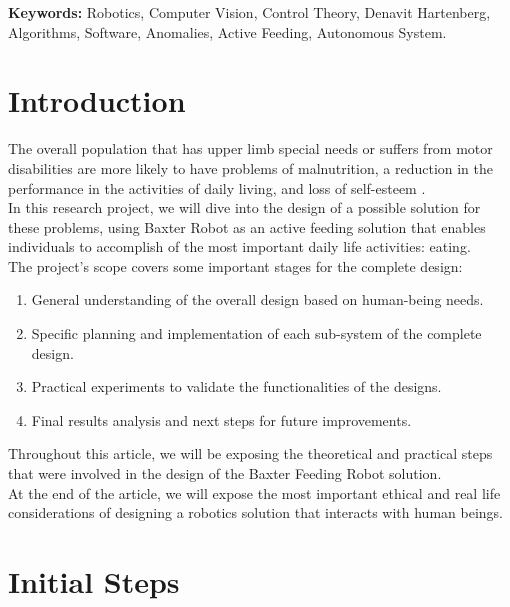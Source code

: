 \documentclass[11pt]{report} %
\begin{document}
\textbf{Keywords:} Robotics, Computer Vision, Control Theory, Denavit Hartenberg, Algorithms, Software, Anomalies, Active Feeding, Autonomous System.


\chapter*{Introduction}

The overall population that has upper limb special needs or suffers from motor disabilities are more likely to have problems of malnutrition, a reduction in the performance in the activities of daily living, and loss of self-esteem  \citep{cite_ICBF_technical_article, cite_upper_limb_disabilities_self_steem}.\\

In this research project, we will dive into the design of a possible solution for these problems, using Baxter Robot as an active feeding solution that enables individuals to accomplish of the most important daily life activities: eating.\\

The project's scope covers some important stages for the complete design: \\

\begin{enumerate}
    \item General understanding of the overall design based on human-being needs.
    \item Specific planning and implementation of each sub-system of the complete design.
    \item Practical experiments to validate the functionalities of the designs.
    \item Final results analysis and next steps for future improvements.
\end{enumerate}

Throughout this article, we will be exposing the theoretical and practical steps that were involved in the design of the Baxter Feeding Robot solution.\\

At the end of the article, we will expose the most important ethical and real life considerations of designing a robotics solution that interacts with human beings.


\chapter{Initial Steps}
\end{document}

